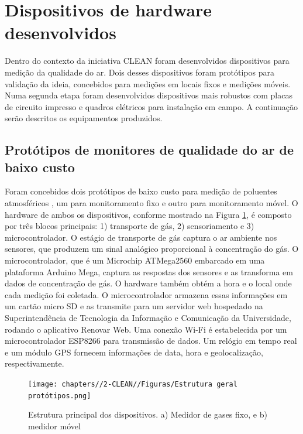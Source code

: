 



\section{Dispositivos de hardware desenvolvidos}

Dentro do contexto da iniciativa CLEAN foram desenvolvidos dispositivos para medição da qualidade do ar. Dois desses dispositivos foram protótipos para validação da ideia, concebidos para medições em locais fixos e medições móveis. Numa segunda etapa foram desenvolvidos dispositivos mais robustos com placas de circuito impresso e quadros elétricos para instalação em campo. A continuação serão descritos os equipamentos produzidos.

\subsection{Protótipos de monitores de qualidade do ar de baixo custo}

Foram concebidos dois protótipos de baixo custo para medição de poluentes atmosféricos \cite{Campo2020DEPLOYMENTRESULTS}, um para monitoramento fixo e outro para monitoramento móvel. O hardware de ambos os dispositivos, conforme mostrado na Figura \ref{fig:device-structure}, é composto por três blocos principais: 1) transporte de gás, 2) sensoriamento e 3) microcontrolador. O estágio de transporte de gás captura o ar ambiente nos sensores, que produzem um sinal analógico proporcional à concentração do gás. O microcontrolador, que é um Microchip ATMega2560 embarcado em uma plataforma Arduino Mega, captura as respostas dos sensores e as transforma em dados de concentração de gás. O hardware também obtém a hora e o local onde cada medição foi coletada. O microcontrolador armazena essas informações em um cartão micro SD e as transmite para um servidor web hospedado na Superintendência de Tecnologia da Informação e Comunicação da Universidade, rodando o aplicativo Renovar Web. Uma conexão Wi-Fi é estabelecida por um microcontrolador ESP8266 para transmissão de dados. Um relógio em tempo real e um módulo GPS fornecem informações de data, hora e geolocalização, respectivamente.

\begin{figure}
    \centering
    \caption{Estrutura principal dos dispositivos. a) Medidor de gases fixo, e b) medidor móvel}
    \texttt{[image: chapters//2-CLEAN//Figuras/Estrutura geral protótipos.png]}
    \label{fig:device-structure}
\end{figure}

